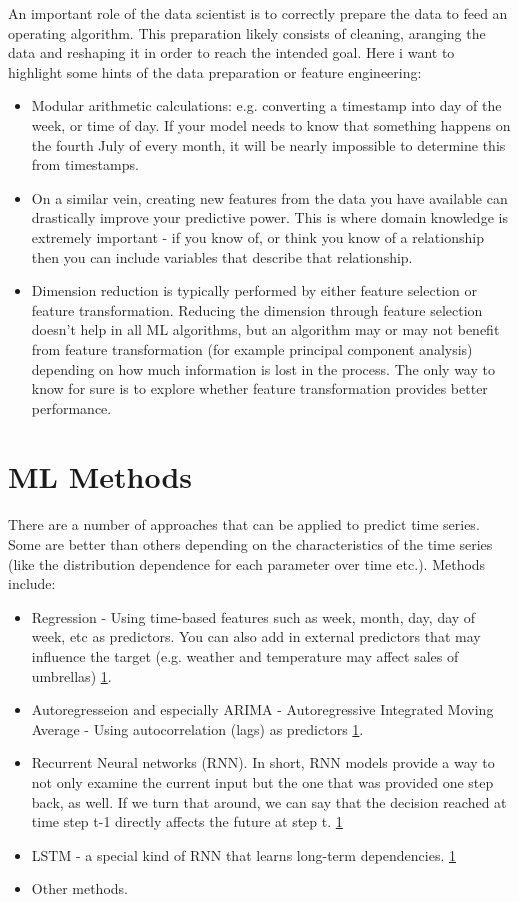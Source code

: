 \documentclass[11pt,fleqn]{book} %
\begin{document}
An important role of the data scientist is to correctly prepare the data to feed an operating algorithm. This preparation likely consists of cleaning, aranging the data and reshaping it in order to reach the intended goal. Here i want to highlight some hints of the data preparation or feature engineering:

\begin{itemize}
\item Modular arithmetic calculations: e.g. converting a timestamp into day of the week, or time of day. If your model needs to know that something happens on the fourth July of every month, it will be nearly impossible to determine this from timestamps.

\item On a similar vein, creating new features from the data you have available can drastically improve your predictive power. This is where domain knowledge is extremely important - if you know of, or think you know of a relationship then you can include variables that describe that relationship. 

\item Dimension reduction is typically performed by either feature selection or feature transformation. Reducing the dimension through feature selection doesn't help in all ML algorithms, but an algorithm may or may not benefit from feature transformation (for example principal component analysis) depending on how much information is lost in the process. The only way to know for sure is to explore whether feature transformation provides better performance.
\end{itemize}

\section{ML Methods}

There are a number of approaches that can be applied to predict time series. Some are better than others depending on the characteristics of the time series (like the distribution dependence for each parameter over time etc.). Methods include:
\begin{itemize}
\item Regression - Using time-based features such as week, month, day, day of week, etc as predictors. You can also add in external predictors that may influence the target (e.g. weather and temperature may affect sales of umbrellas) \ref{}.
\item Autoregresseion and especially ARIMA - Autoregressive Integrated Moving Average - Using autocorrelation (lags) as predictors \ref{}.
\item Recurrent Neural networks (RNN). In short, RNN models provide a way to not only examine the current input but the one that was provided one step back, as well. If we turn that around, we can say that the decision reached at time step t-1 directly affects the future at step t. \ref{}
\item LSTM - a special kind of RNN that learns long-term dependencies. \ref{}
\item Other methods.
\end{itemize}
\end{document}
